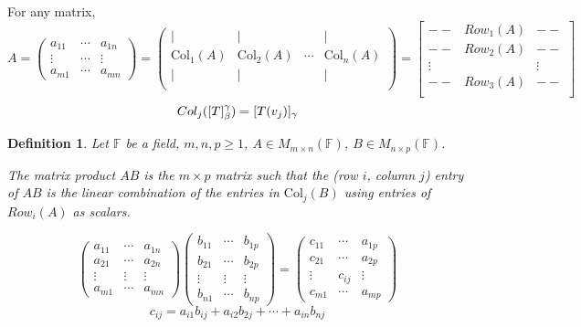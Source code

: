 \documentclass[12pt]{article}
\newtheorem{definition}{Definition}[subsection]
\newcommand{\Col}{\mathrm{Col}}
\newcommand{\mF}{{\mathbb{F}}}
\begin{document}
	For any matrix, 
	\[
		A =
		\begin{pmatrix}
			a_{11} & \cdots & a_{1n}\\
			\vdots & \cdots & \vdots \\ 
			a_{m1} & \cdots & a_{mn}
		\end{pmatrix}
		= 
		\begin{pmatrix}
			| & | & & | \\
			\Col_1(A) & \Col_2(A) & \cdots & \Col_n(A)\\
			| & | & & | \\
		\end{pmatrix}
		= 
		\begin{bmatrix}
			-- & Row_1(A) & --\\
			-- & Row_2(A) & --\\
			\vdots & & \vdots\\
			-- & Row_3(A) & --\\
		\end{bmatrix}
	\]
	\[
		Col_j([T]_{\beta}^{\gamma}) = [T(v_j)]_{\gamma}\\
	\]
	
	\begin{definition}
		Let $\mF$ be a field, $m,n,p \geq1$, $A\in M_{m\times n}(\mF)$, 
		$B\in M_{n\times p} (\mF)$.

		
		The matrix product $AB$ is the $m \times p$ matrix such that the 
		(row $i$, column $j$) entry of $AB$ is the linear combination of the 
		entries in $\Col_j(B)$ using entries of $Row_i(A)$ as scalars. 
	\end{definition}

	\[
		\begin{pmatrix}
			a_{11} & \cdots & a_{1n}\\
			a_{21} & \cdots & a_{2n} \\
			\vdots & \vdots & \vdots \\
			a_{m1} & \cdots & a_{mn}
		\end{pmatrix}
		\begin{pmatrix}
			b_{11} & \cdots & b_{1p}\\
			b_{21} & \cdots & b_{2p} \\
			\vdots & \vdots & \vdots \\
			b_{n1} & \cdots & b_{np}
		\end{pmatrix}
		=
		\begin{pmatrix}
			c_{11} & \cdots & a_{1p} \\
			c_{21} & \cdots & a_{2p} \\
			\vdots & c_{ij} & \vdots \\
			c_{m1} & \cdots & a_{mp} 
		\end{pmatrix}
	\]
	\[
		c_{ij} = a_{i1}b_{ij}+a_{i2}b_{2j}+\cdots+a_{in}b_{nj}
	\]
\end{document}
